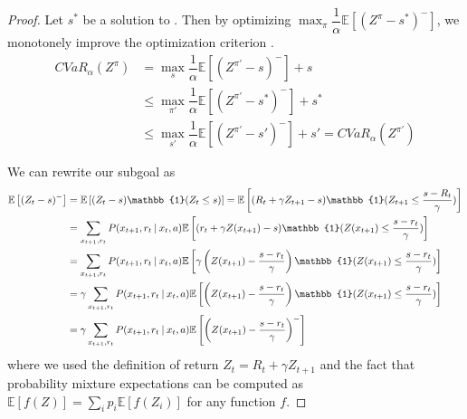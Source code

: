 \begin{proof}

Let $s^*$ be a solution to . Then by optimizing $\max_\pi \dfrac{1}{\alpha}\mathbb{E}
\left[ (Z^\pi-s^*)^-\right]$, we monotonely improve the optimization criterion .
\begin{align*}
CVaR_\alpha(Z^{\pi}) &= \max_{s}\dfrac{1}{\alpha}\mathbb{E}\left[ (Z^{\pi'}-s)^-\right] + s \\
&\le \max_{\pi'}\dfrac{1}{\alpha}\mathbb{E} \left[ (Z^{\pi'}-s^*)^-\right] + s^*\\
 &\le \max_{s'}\dfrac{1}{\alpha}\mathbb{E}\left[ (Z^{\pi'}-s')^-\right] + s' = CVaR_\alpha(Z^{\pi'})
\end{align*}

We can rewrite our subgoal as
\begin{equation}
\begin{split}
\mathbb{E}\left[(Z_t-s)^-\right] &= \mathbb{E}\left[(Z_t-s)\mathbb{1}(Z_t\le s)\right] = \mathbb{E}\left[(R_t + \gamma Z_{t+1}-s)\mathbb{1}(Z_{t+1}\le \dfrac{s - R_t}{\gamma})\right]\\
&= \sum_{x_{t+1}, r_t} P(x_{t+1}, r_t \given x_t, a)\mathbb{E}\left[(r_t + \gamma Z(x_{t+1})-s)\mathbb{1}(Z(x_{t+1})\le \dfrac{s - r_t}{\gamma})\right]\\
&= \sum_{x_{t+1}, r_t} P(x_{t+1}, r_t \given x_t, a)\mathbb{E}\left[\gamma\left(Z(x_{t+1})-\dfrac{s-r_t}{\gamma}\right)\mathbb{1}(Z(x_{t+1})\le \dfrac{s - r_t}{\gamma})\right]\\
&= \gamma\sum_{x_{t+1}, r_t} P(x_{t+1}, r_t \given x_t, a)\mathbb{E}\left[\left(Z(x_{t+1})-\dfrac{s-r_t}{\gamma}\right)\mathbb{1}(Z(x_{t+1})\le \dfrac{s - r_t}{\gamma})\right]\\
&= \gamma\sum_{x_{t+1}, r_t} P(x_{t+1}, r_t \given x_t, a)\mathbb{E}\left[\left(Z(x_{t+1}) - \dfrac{s - r_t}{\gamma}\right)^-\right]
\end{split}
\end{equation}
where we used the definition of return $Z_t = R_t + \gamma Z_{t+1}$ and the fact that probability mixture expectations can be computed as $\mathbb{E}[f(Z)] = \sum_i p_i \mathbb{E}[f(Z_i)]$ for any function $f$.


\end{proof}
